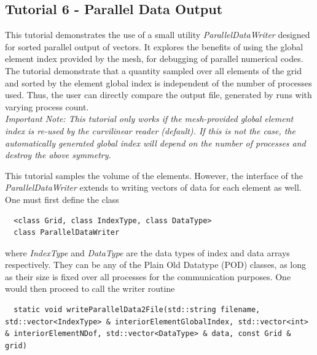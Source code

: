 \subsection{Tutorial 6 - Parallel Data Output}
\label{usage-howto-tutorial-paralleldataoutput}

This tutorial demonstrates the use of a small utility \textit{ParallelDataWriter} designed for sorted parallel output of vectors. It explores the benefits of using the global element index provided by the mesh, for debugging of parallel numerical codes. The tutorial demonstrate that a quantity sampled over all elements of the grid and sorted by the element global index is independent of the number of processes used. Thus, the user can directly compare the output file, generated by runs with varying process count. \\

\noindent
\textit{Important Note: This tutorial only works if the mesh-provided global element index is re-used by the curvilinear \gmsh{} reader (default). If this is not the case, the automatically generated global index will depend on the number of processes and destroy the above symmetry.}

\noindent
This tutorial samples the volume of the elements. However, the interface of the \textit{ParallelDataWriter} extends to writing vectors of data for each element as well. One must first define the class

\begin{mybox}
\begin{lstlisting}
  <class Grid, class IndexType, class DataType>
  class ParallelDataWriter
\end{lstlisting}
\end{mybox}

\noindent
where \textit{IndexType} and \textit{DataType} are the data types of index and data arrays respectively. They can be any of the Plain Old Datatype (POD) classes, as long as their size is fixed over all processes for the communication purposes. One would then proceed to call the writer routine

\begin{mybox}
\begin{lstlisting}
  static void writeParallelData2File(std::string filename, std::vector<IndexType> & interiorElementGlobalIndex, std::vector<int> & interiorElementNDof, std::vector<DataType> & data, const Grid & grid)
\end{lstlisting}
\end{mybox}

